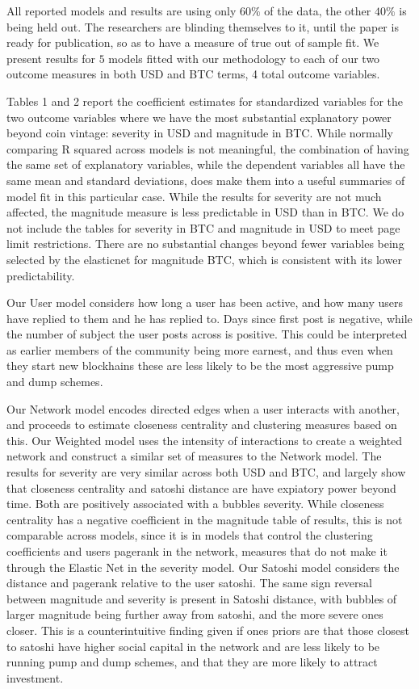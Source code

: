 All reported models and results are using only $60\%$ of the data, the other $40\%$ is being held out. The researchers are blinding themselves to it, until the paper is ready for publication, so as to have a measure of true out of sample fit. 
We present results for $5$ models fitted with our methodology to each of our two outcome measures in both USD and BTC terms, 4 total outcome variables.

Tables 1 and 2 report the coefficient estimates for standardized variables for the two outcome variables where we have the most substantial explanatory power beyond coin vintage: severity in USD and magnitude in BTC. While normally comparing R squared across models is not meaningful, the combination of having the same set of explanatory variables, while the dependent variables all have the same mean and standard deviations, does make them into a useful summaries of model fit in this particular case. 
While the results for severity are not much affected, the magnitude measure is less predictable in USD than in BTC.
We do not include the tables for severity in BTC and magnitude in USD to meet page limit restrictions.
There are no substantial changes beyond fewer variables being selected by the elasticnet for magnitude BTC, which is consistent with its lower predictability.

Our User model considers how long a user has been active, and how many users have replied to them and he has replied to. 
Days since first post is negative, while the number of subject the user posts across is positive. This could be interpreted as earlier members of the community being more earnest, and thus even when they start new blockhains these are less likely to be the most aggressive pump and dump schemes. 

Our Network model encodes directed edges when a user interacts with another, and proceeds to estimate closeness centrality and clustering measures based on this. 
Our Weighted model uses the intensity of interactions to create a weighted network and construct a similar set of measures to the Network model.
The results for severity are very similar across both USD and BTC, and largely show that closeness centrality and satoshi distance are have expiatory power beyond time. Both  are positively associated with a bubbles severity.
While closeness centrality has a negative coefficient in the magnitude table of results, this is not comparable across models, since it is in models that control the clustering coefficients and users pagerank in the network, measures that do not make it through the Elastic Net in the severity model. 
Our Satoshi model considers the distance and pagerank relative to the user satoshi.
The same sign reversal between magnitude and severity is present in Satoshi distance, with bubbles of larger magnitude being further away from satoshi, and the more severe ones closer.
This is a counterintuitive finding given if ones priors are that those closest to satoshi have higher social capital in the network and are less likely to be running pump and dump schemes, and that they are more likely to attract investment. 

